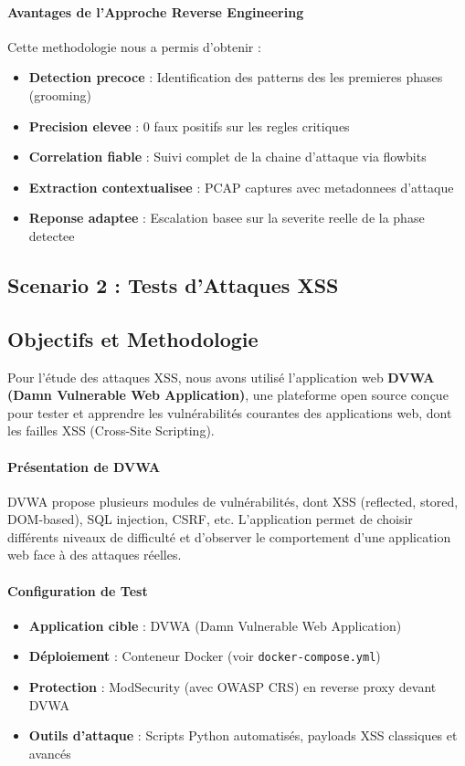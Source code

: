 \paragraph{Avantages de l'Approche Reverse Engineering}

Cette methodologie nous a permis d'obtenir :

\begin{itemize}
    \item \textbf{Detection precoce} : Identification des patterns des les premieres phases (grooming)
    \item \textbf{Precision elevee} : 0 faux positifs sur les regles critiques
    \item \textbf{Correlation fiable} : Suivi complet de la chaine d{'}attaque via flowbits
    \item \textbf{Extraction contextualisee} : PCAP captures avec metadonnees d{'}attaque
    \item \textbf{Reponse adaptee} : Escalation basee sur la severite reelle de la phase detectee
\end{itemize}


\subsection{Scenario 2 : Tests d{'}Attaques XSS}


\subsection{Objectifs et Methodologie}

Pour l'étude des attaques XSS, nous avons utilisé l'application web \textbf{DVWA (Damn Vulnerable Web Application)}, une plateforme open source conçue pour tester et apprendre les vulnérabilités courantes des applications web, dont les failles XSS (Cross-Site Scripting).

\paragraph{Présentation de DVWA}
DVWA propose plusieurs modules de vulnérabilités, dont XSS (reflected, stored, DOM-based), SQL injection, CSRF, etc. L'application permet de choisir différents niveaux de difficulté et d'observer le comportement d'une application web face à des attaques réelles.

\paragraph{Configuration de Test}
\begin{itemize}
    \item \textbf{Application cible} : DVWA (Damn Vulnerable Web Application)
    \item \textbf{Déploiement} : Conteneur Docker (voir \texttt{docker-compose.yml})
    \item \textbf{Protection} : ModSecurity (avec OWASP CRS) en reverse proxy devant DVWA
    \item \textbf{Outils d{'}attaque} : Scripts Python automatisés, payloads XSS classiques et avancés
\end{itemize}

